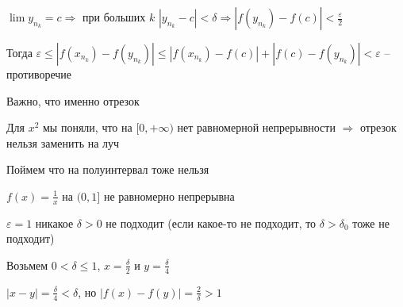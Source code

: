 \documentclass[12pt]{article}
\begin{document}
$\lim y_{n_k} = c \Rightarrow$ при больших $k$ $|y_{n_k} - c| < \delta \Rightarrow |f(y_{n_k}) - f(c)| < \frac{\varepsilon}{2}$

Тогда $\varepsilon \leq |f(x_{n_k}) - f(y_{n_k})| \leq |f(x_{n_k}) - f(c)| + |f(c) - f(y_{n_k})| < \varepsilon$ -- противоречие

\begin{Remark}{}
    Важно, что именно отрезок

    Для $x^2$ мы поняли, что на $[0, + \infty)$ нет равномерной непрерывности $\Rightarrow$ отрезок нельзя заменить на луч

    Поймем что на полуинтервал тоже нельзя

    $f(x) = \frac{1}{x}$ на $(0, 1]$ не равномерно непрерывна

    $\varepsilon = 1$ никакое $\delta > 0$ не подходит (если какое-то не подходит, то $\delta > \delta_0$ тоже не подходит)

    Возьмем $0 < \delta \leq 1$, $x = \frac{\delta}{2}$ и $y = \frac{\delta}{4}$

    $|x - y| = \frac{\delta}{4} < \delta$, но $|f(x) - f(y)| = \frac{2}{\delta} > 1$
\end{Remark}
\end{document}
